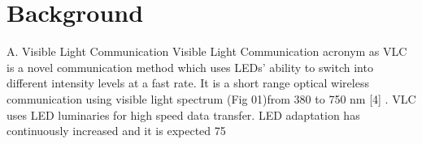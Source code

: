 \chapter{Background}
A. Visible Light Communication
Visible Light Communication acronym as VLC is a novel communication method which uses LEDs' ability to switch into different intensity levels at a fast rate. It is a short range optical wireless communication using visible light spectrum (Fig 01)from 380 to 750 nm [4] . VLC uses LED luminaries for high speed data transfer. LED adaptation has continuously increased and it is expected 75%

